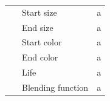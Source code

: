 \documentclass{scrreprt}
\begin{document}
\begin{table}
\begin{tabular}{lll}
    ~                        & Start size              & a           \\
    ~                        & End size                & a           \\
    ~                        & Start color             & a           \\
    ~                        & End color               & a           \\
    ~                        & Life                    & a           \\
    ~                        & Blending function       & a           \\
    \end{tabular}
\end{table}
\end{document}
